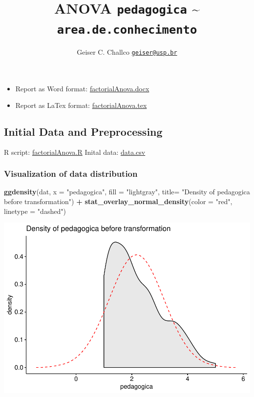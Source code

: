 \documentclass[]{article}
\title{ANOVA \texttt{pedagogica} \textasciitilde{}
\texttt{area.de.conhecimento}}
\author{Geiser C. Challco \href{mailto:geiser@usp.br}{\nolinkurl{geiser@usp.br}}}
\date{}
\newenvironment{Shaded}{\begin{snugshade}}{\end{snugshade}}
\newcommand{\DataTypeTok}[1]{\textcolor[rgb]{0.13,0.29,0.53}{#1}}
\newcommand{\KeywordTok}[1]{\textcolor[rgb]{0.13,0.29,0.53}{\textbf{#1}}}
\newcommand{\NormalTok}[1]{#1}
\newcommand{\OperatorTok}[1]{\textcolor[rgb]{0.81,0.36,0.00}{\textbf{#1}}}
\newcommand{\StringTok}[1]{\textcolor[rgb]{0.31,0.60,0.02}{#1}}
\providecommand{\tightlist}{%
  \setlength{\itemsep}{0pt}\setlength{\parskip}{0pt}}
\begin{document}
\maketitle

\begin{itemize}
\tightlist
\item
  Report as Word format: \url{factorialAnova.docx}
\item
  Report as LaTex format: \url{factorialAnova.tex}
\end{itemize}

\hypertarget{initial-data-and-preprocessing}{%
\subsection{Initial Data and
Preprocessing}\label{initial-data-and-preprocessing}}

R script: \url{factorialAnova.R} Inital data: \url{data.csv}

\hypertarget{visualization-of-data-distribution}{%
\subsubsection{Visualization of data
distribution}\label{visualization-of-data-distribution}}

\begin{Shaded}
\begin{Highlighting}[]
\KeywordTok{ggdensity}\NormalTok{(dat, }\DataTypeTok{x =} \StringTok{"pedagogica"}\NormalTok{, }\DataTypeTok{fill =} \StringTok{"lightgray"}\NormalTok{, }\DataTypeTok{title=} \StringTok{"Density of pedagogica before transformation"}\NormalTok{) }\OperatorTok{+}
\StringTok{ }\KeywordTok{stat_overlay_normal_density}\NormalTok{(}\DataTypeTok{color =} \StringTok{"red"}\NormalTok{, }\DataTypeTok{linetype =} \StringTok{"dashed"}\NormalTok{)}
\end{Highlighting}
\end{Shaded}

\includegraphics{factorialAnova_files/figure-latex/unnamed-chunk-1-1.pdf}
\end{document}
